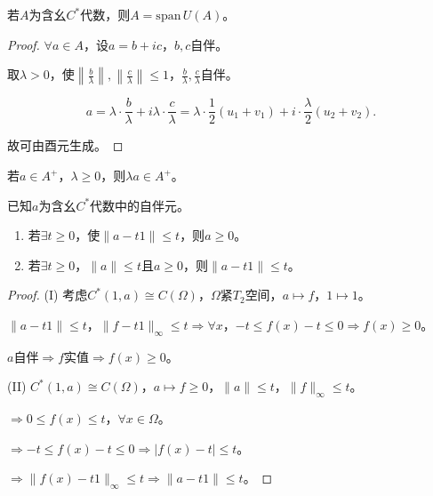 \documentclass[lang=cn,a4paper,newtx,section]{elegantbook}
\begin{document}
\begin{corollary}
  若$A$为含幺$C^*$代数，则$A = \mathrm{span}\, U(A)$。
\end{corollary}

\begin{proof}
  $\forall a \in A$，设$a = b + ic$，$b, c$自伴。
  
  取$\lambda > 0$，使$\left\|\frac{b}{\lambda}\right\|, \left\|\frac{c}{\lambda}\right\| \leq 1$，$\frac{b}{\lambda}, \frac{c}{\lambda}$自伴。
  
  \begin{equation*}
    a = \lambda \cdot \frac{b}{\lambda} + i\lambda \cdot \frac{c}{\lambda} = \lambda \cdot \frac{1}{2}(u_1 + v_1) + i \cdot \frac{\lambda}{2}(u_2 + v_2).
  \end{equation*}
  
  故可由酉元生成。
\end{proof}

\begin{proposition}
  若$a \in A^+$，$\lambda \geq 0$，则$\lambda a \in A^+$。
\end{proposition}

\begin{lemma}
  已知$a$为含幺$C^*$代数中的自伴元。
  \begin{enumerate}
    \item 若$\exists t \geq 0$，使$\|a - t1\| \leq t$，则$a \geq 0$。
    \item 若$\exists t \geq 0$，$\|a\| \leq t$且$a \geq 0$，则$\|a - t1\| \leq t$。
  \end{enumerate}
\end{lemma}

\begin{proof}
  (I) 考虑$C^*(1, a) \cong C(\Omega)$，$\Omega$紧$T_2$空间，$a \mapsto f$，$1 \mapsto 1$。
  
  $\|a - t1\| \leq t$，$\|f - t1\|_\infty \leq t \Rightarrow \forall x$，$-t \leq f(x) - t \leq 0 \Rightarrow f(x) \geq 0$。
  
  $a$自伴$\Rightarrow f$实值$\Rightarrow f(x) \geq 0$。
  
  (II) $C^*(1, a) \cong C(\Omega)$，$a \mapsto f \geq 0$，$\|a\| \leq t$，$\|f\|_\infty \leq t$。
  
  $\Rightarrow 0 \leq f(x) \leq t$，$\forall x \in \Omega$。
  
  $\Rightarrow -t \leq f(x) - t \leq 0 \Rightarrow |f(x) - t| \leq t$。
  
  $\Rightarrow \|f(x) - t1\|_\infty \leq t \Rightarrow \|a - t1\| \leq t$。
\end{proof}
\end{document}
